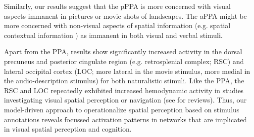\documentclass[english]{article}
\begin{document}
Similarly, our results suggest that the pPPA is more concerned with visual
aspects immanent in pictures or movie shots of landscapes.
The aPPA might be more concerned with non-visual aspects of spatial information
(e.g. spatial contextual information \citep{aminoff2013role,
aminoff2015associative, baumann2016functional}) as immanent in both visual and
verbal stimuli.


Apart from the PPA, results show significantly increased activity in the
dorsal precuneus and posterior cingulate region (e.g. retrosplenial complex;
RSC) and lateral occipital cortex (LOC; more lateral in the movie stimulus, more
medial in the audio-description stimulus) for both naturalistic stimuli.
Like the PPA, the RSC and LOC repeatedly exhibited increased hemodynamic activity
in studies investigating visual spatial perception or navigation (see
\citep{chrastil2018heterogeneity, bettencourt2013role} for reviews).
Thus, our model-driven approach to operationalize spatial perception based on stimulus
annotations reveals focussed activation patterns in networks that are implicated
in visual spatial perception and cognition.
\end{document}
